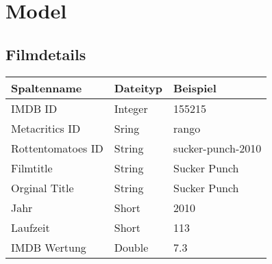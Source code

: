 \section{Model}
\subsection{Filmdetails}
\begin{center}
\begin{tabular}{|l|l|l|}
\hline
Spaltenname & Dateityp & Beispiel \\
\hline
\hline
IMDB ID & Integer & 155215\\
Metacritics ID & Sring & rango\\
Rottentomatoes ID & String & sucker-punch-2010\\
Filmtitle & String & Sucker Punch\\
Orginal Title & String & Sucker Punch\\
Jahr & Short & 2010\\
Laufzeit & Short & 113\\
IMDB Wertung & Double & 7.3\\
\hline
\end{tabular}
\end{center}